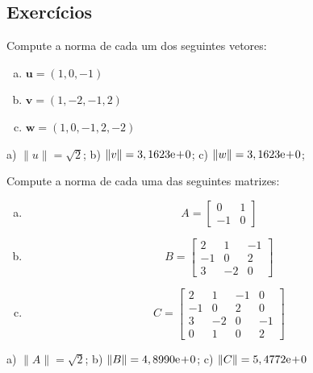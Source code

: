 \subsection{Exercícios}

\begin{exer}
  Compute a norma de cada um dos seguintes vetores:
  \begin{enumerate}[a)]
  \item $\displaystyle \pmb{u} = (1, 0, -1)$
  \item $\displaystyle \pmb{v} = (1, -2, -1, 2)$
  \item $\displaystyle \pmb{w} = (1, 0, -1, 2, -2)$
  \end{enumerate}
\end{exer}
\begin{resp}
  a) $\|u\| = \sqrt{2}$; b) $\|v\| = 3,1623\mathrm{e}\!+\!0$; c) $\|w\| = 3,1623\mathrm{e}\!+\!0$;
\end{resp}

\begin{exer}
  Compute a norma de cada uma das seguintes matrizes:
  \begin{enumerate}[a)]
  \item
    \begin{equation}
      A =
      \begin{bmatrix}
        0 & 1\\
        -1 & 0
      \end{bmatrix}
    \end{equation}
  \item 
    \begin{equation}
      B =
      \begin{bmatrix}
        2 & 1 & -1\\
        -1 & 0 & 2\\
        3 & -2 & 0
      \end{bmatrix}
    \end{equation}
  \item 
    \begin{equation}
      C =
      \begin{bmatrix}
        2 & 1 & -1 & 0\\
        -1 & 0 & 2 & 0\\
        3 & -2 & 0 & -1\\
        0 & 1 & 0 & 2
      \end{bmatrix}
    \end{equation}
  \end{enumerate}
\end{exer}
\begin{resp}
  a) $\|A\| = \sqrt{2}$; b) $\|B\| = 4,8990\mathrm{e}\!+\!0$; c) $\|C\| = 5,4772\mathrm{e}\!+\!0$
\end{resp}

